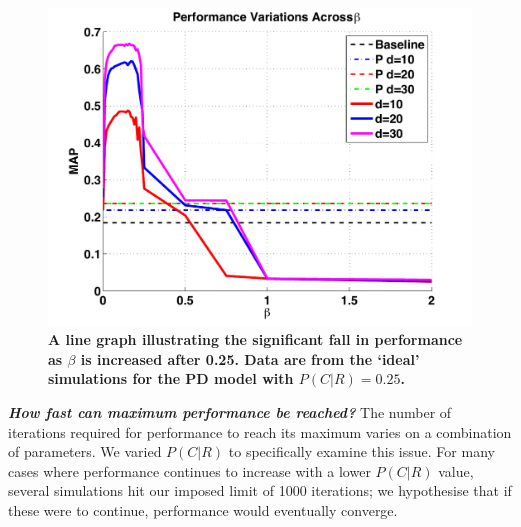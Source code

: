 \begin{figure}
	\begin{center}
	\includegraphics[width=\linewidth]{pics/perfect/perfect_map_fall.pdf}
	\end{center}
	\vspace{-0.5cm}
	\caption{\label{fig:perfect_map_fall}\textbf{A line graph illustrating the significant fall in performance as $\beta$ is increased after 0.25. Data are from the `ideal' simulations for the PD model with $P(C|R) = 0.25$.}\vspace{-0.5cm}}
\end{figure}

\textbf{\emph{How fast can maximum performance be reached?}}
The number of iterations required for performance to reach its maximum varies on a combination of parameters. We varied $P(C|R)$ to specifically examine this issue. For many cases where performance continues to increase with a lower $P(C|R)$ value, several simulations hit our imposed limit of 1000 iterations; we hypothesise that if these were to continue, performance would eventually converge.

